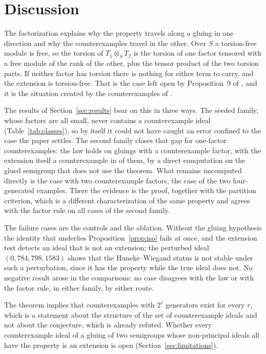 \documentclass[11pt]{article}
\theoremstyle{definition}
\theoremstyle{remark}
\begin{document}
\section{Discussion}\label{sec:discussion}

The factorization explains why the property travels along a gluing in one direction and why the counterexamples travel in the other. Over $S$ a torsion-free module is free, so the torsion of $T_1\otimes_ST_2$ is the torsion of one
factor tensored with a free module of the rank of the other, plus the tensor product of the two torsion parts. If neither factor has torsion there is nothing for either term to carry, and the extension is torsion-free. That is
the case left open by Proposition~9 of \cite{GarciaSanchezLeamer2013}, and it is the situation created by the counterexamples of \cite{Pham2026,ChristensenGerkoIyengar2026,SantibanezLeal2026}.

The results of Section~\ref{sec:results} bear on this in three ways. The seeded family, whose factors are all small, never contains a counterexample ideal (Table~\ref{tab:classes}), so by itself it could not have caught an error confined to
the case the paper settles. The second family closes that gap for one-factor counterexamples: the law holds on \NHardCE{} gluings with a counterexample factor, with the extension itself a counterexample in \NHardCEItself{} of them, by a direct
computation on the glued semigroup that does not use the theorem. What remains uncomputed directly is the case with two counterexample factors, the case of the two four-generated examples. There the evidence is the proof, together with the
partition criterion, which is a different characterization of the same property and agrees with the factor rule on all \NHard{} cases of the second family.

The failure cases are the controls and the ablation. Without the gluing hypothesis the identity that underlies Proposition~\ref{prop:iso} fails at once, and the extension test detects an ideal that is not an extension; the perturbed ideal $(0,784,798,1583)$ shows that
the Huneke--Wiegand status is not stable under such a perturbation, since it has the property while the true ideal does not. No negative result arose in the comparisons: no case disagrees with the law or with the factor rule, in either family, by either route.

The theorem implies that counterexamples with $2^r$ generators exist for every $r$, which is a statement about the structure of the set of counterexample ideals and not about the conjecture, which is already refuted. Whether
every counterexample ideal of a gluing of two semigroups whose non-principal ideals all have the property is an extension is open (Section~\ref{sec:limitations}).
\end{document}
